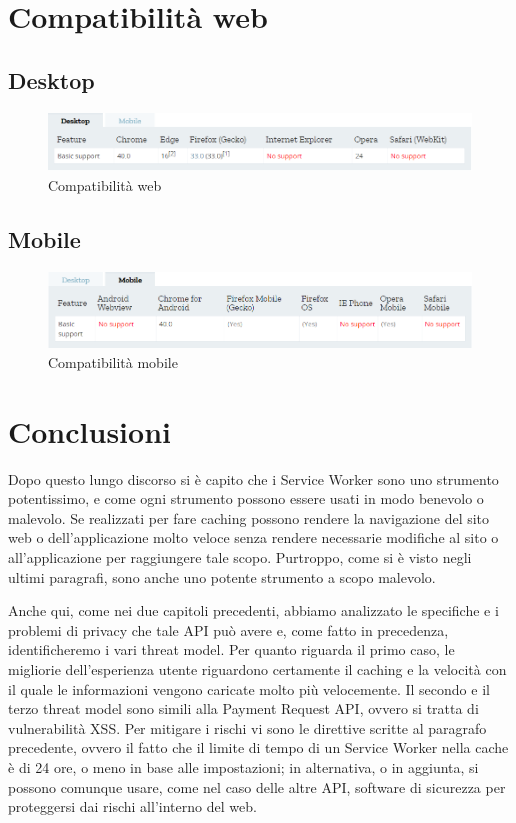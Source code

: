\documentclass[11pt ,a4paper , twoside , openright ]{book}
\begin{document}
	\newpage
	\section{Compatibilità web}
	\subsection{Desktop}
	\begin{figure}[h]
		\centering
		\includegraphics[width=1\linewidth]{CompWeb}
		\caption{Compatibilità web}
		\label{fig:Compatibilità web}
	\end{figure}
	\subsection{Mobile}
	\begin{figure}[h]
		\centering
		\includegraphics[width=1\linewidth]{CompMobile}
		\caption{Compatibilità mobile}
		\label{fig:Compatibilità mobile}
	\end{figure}
	\section{Conclusioni}
	Dopo questo lungo discorso si è capito che i Service Worker sono uno strumento potentissimo, e come ogni strumento possono essere usati in modo benevolo o malevolo.
	Se realizzati per fare caching possono rendere la navigazione del sito web o dell'applicazione molto veloce senza rendere necessarie modifiche al sito o all'applicazione per raggiungere tale scopo. 
	Purtroppo, come si è visto negli ultimi paragrafi, sono anche uno potente strumento a scopo malevolo.
	
	Anche qui, come nei due capitoli precedenti, abbiamo analizzato le specifiche e i problemi di privacy che tale API può avere e, come fatto in precedenza, identificheremo i vari threat model.
	Per quanto riguarda il primo caso, le migliorie dell'esperienza utente riguardono certamente il caching e la velocità con il quale le informazioni vengono caricate molto più velocemente.
	Il secondo e il terzo threat model sono simili alla Payment Request API, ovvero si tratta di vulnerabilità XSS.
	Per mitigare i rischi vi sono le direttive scritte al paragrafo precedente, ovvero il fatto che il limite di tempo di un Service Worker nella cache è di 24 ore, o meno in base alle impostazioni; in alternativa, o in aggiunta, si possono comunque usare, come nel caso delle altre API, software di sicurezza per proteggersi dai rischi all'interno del web.
	
\end{document}
